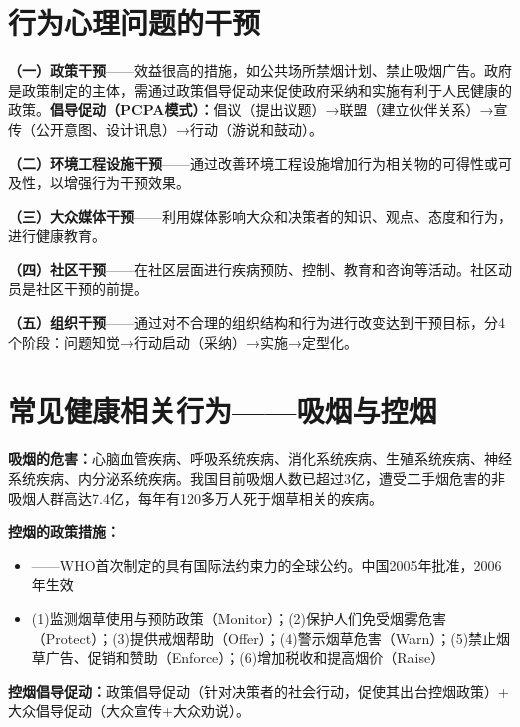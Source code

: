 \section{行为心理问题的干预}

\begin{defbox}
\textbf{（一）政策干预}——效益很高的措施，如公共场所禁烟计划、禁止吸烟广告。政府是政策制定的主体，需通过政策倡导促动来促使政府采纳和实施有利于人民健康的政策。\textbf{倡导促动（PCPA模式）：}倡议（提出议题）→联盟（建立伙伴关系）→宣传（公开意图、设计讯息）→行动（游说和鼓动）。

\textbf{（二）环境工程设施干预}——通过改善环境工程设施增加行为相关物的可得性或可及性，以增强行为干预效果。

\textbf{（三）大众媒体干预}——利用媒体影响大众和决策者的知识、观点、态度和行为，进行健康教育。

\textbf{（四）社区干预}——在社区层面进行疾病预防、控制、教育和咨询等活动。社区动员是社区干预的前提。

\textbf{（五）组织干预}——通过对不合理的组织结构和行为进行改变达到干预目标，分4个阶段：问题知觉→行动启动（采纳）→实施→定型化。
\end{defbox}

\section{常见健康相关行为——吸烟与控烟}

\begin{keybox}
\textbf{吸烟的危害：}心脑血管疾病、呼吸系统疾病、消化系统疾病、生殖系统疾病、神经系统疾病、内分泌系统疾病。我国目前吸烟人数已超过3亿，遭受二手烟危害的非吸烟人群高达7.4亿，每年有120多万人死于烟草相关的疾病。

\textbf{控烟的政策措施：}
\begin{itemize}[leftmargin=*]
    \item {}——WHO首次制定的具有国际法约束力的全球公约。中国2005年批准，2006年生效
    \item {}(1)监测烟草使用与预防政策（Monitor）；(2)保护人们免受烟雾危害（Protect）；(3)提供戒烟帮助（Offer）；(4)警示烟草危害（Warn）；(5)禁止烟草广告、促销和赞助（Enforce）；(6)增加税收和提高烟价（Raise）
\end{itemize}

\textbf{控烟倡导促动：}政策倡导促动（针对决策者的社会行动，促使其出台控烟政策）+ 大众倡导促动（大众宣传+大众劝说）。
\end{keybox}

